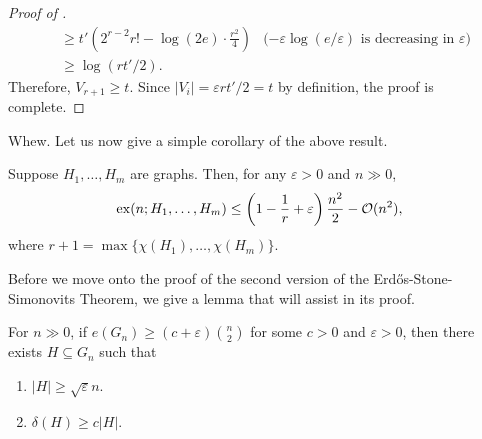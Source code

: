 \begin{proof}[Proof of ]
\begin{align*}
					&\ge t' \left( 2^{r-2} r! - \log(2e) \cdot \frac{r^2}{4} \right) & \text{($-\varepsilon \log(e/\varepsilon)$ is decreasing in $\varepsilon$)} \\
					&\ge \log(rt'/2).
				\end{align*}
				Therefore, $V_{r+1} \ge t$. Since $|V_i| = \varepsilon rt'/2 = t$ by definition, the proof is complete.
			\end{proof}

			Whew. Let us now give a simple corollary of the above result.

			\begin{fpor}
				Suppose $H_1,\ldots,H_m$ are graphs. Then, for any $\varepsilon > 0$ and $n \gg 0$,
				\[ \operatorname{ex}(n;H_1,\ldots,H_m) \le \left(1 - \frac{1}{r} + \varepsilon\right)\frac{n^2}{2} - \mathcal{O}(n^2), \]
				where $r+1=\max\{\chi(H_1),\ldots,\chi(H_m)\}$.
			\end{fpor}


			Before we move onto the proof of the second version of the Erd\H{o}s-Stone-Simonovits Theorem, we give a lemma that will assist in its proof.

			\begin{flem}
				For $n\gg 0$, if $e(G_n) \ge (c+\varepsilon)\binom{n}{2}$ for some $c > 0$ and $\varepsilon > 0$, then there exists $H\subseteq G_n$ such that
				\begin{enumerate}
					\item $|H| \ge \sqrt{\varepsilon} n$.
					\item $\delta(H) \ge c|H|$.
				\end{enumerate}
			\end{flem}


